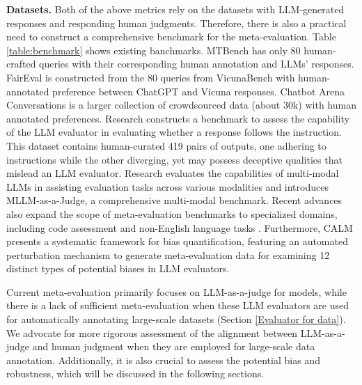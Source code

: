 \documentclass[acmsmall,screen]{acmart}
\begin{document}
\textbf{Datasets.} Both of the above metrics rely on the datasets with LLM-generated responses and responding human judgments.
Therefore, there is also a practical need to construct a comprehensive benchmark for the meta-evaluation. 
Table \ref{table:benchmark} shows existing banchmarks.
MTBench \citep{nips_llm_as_a_judge} has only 80 human-crafted queries with their corresponding human annotation and LLMs' responses.
FairEval \citep{wang-etal-2024-large-language-models-fair} is constructed from the 80 queries from VicunaBench \citep{vicuna2023} with human-annotated preference between ChatGPT and Vicuna responses.
Chatbot Arena Conversations \citep{nips_llm_as_a_judge} is a larger collection of crowdsourced data (about 30k) with human annotated preferences.
Research \cite{zeng2023llmbar} constructs a benchmark to assess the capability of the LLM evaluator in evaluating whether a response follows the instruction.
This dataset contains human-curated 419 pairs of outputs, one adhering to instructions while the other diverging, yet may possess deceptive qualities that mislead an LLM evaluator.
Research \cite{mllm-as-a-judge} evaluates the capabilities of multi-modal LLMs in assisting evaluation tasks across various modalities and introduces MLLM-as-a-Judge, a comprehensive multi-modal benchmark.
Recent advances also expand the scope of meta-evaluation benchmarks to specialized domains, including code assessment \citep{zhao2024codejudge} and non-English language tasks \citep{son2024llm}. 
Furthermore, CALM \citep{ye2024justice} presents a systematic framework for bias quantification, featuring an automated perturbation mechanism to generate meta-evaluation data for examining 12 distinct types of potential biases in LLM evaluators.


Current meta-evaluation primarily focuses on LLM-as-a-judge for models, while there is a lack of sufficient meta-evaluation when these LLM evaluators are used for automatically annotating large-scale datasets (Section \ref{Evaluator for data}). 
We advocate for more rigorous assessment of the alignment between LLM-as-a-judge and human judgment when they are employed for large-scale data annotation. 
Additionally, it is also crucial to assess the potential bias and robustness, which will be discussed in the following sections.
\end{document}
